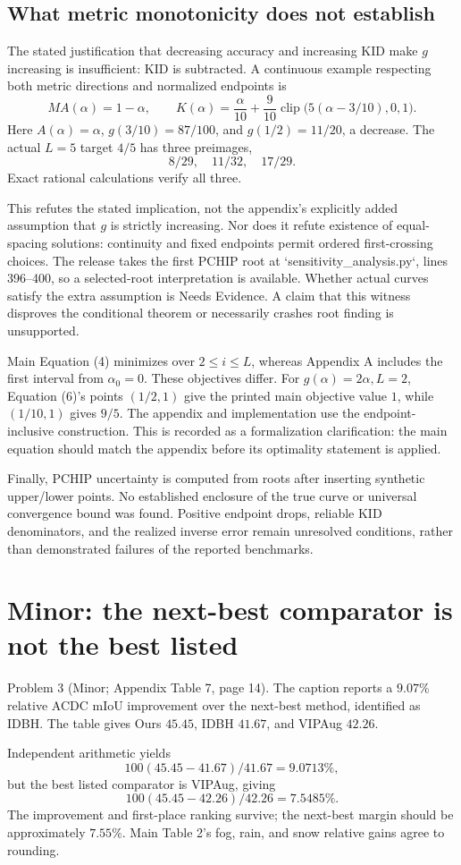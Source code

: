 \documentclass[10pt]{article}
\begin{document}
\subsection*{What metric monotonicity does not establish}
The stated justification that decreasing accuracy and increasing KID make \(g\) increasing is insufficient: KID is subtracted. A continuous example respecting both metric directions and normalized endpoints is \[MA(\alpha)=1-\alpha,\qquad
 K(\alpha)=\frac{\alpha}{10}
 +\frac9{10}\operatorname{clip}\bigl(5(\alpha-3/10),0,1\bigr).\] Here \(A(\alpha)=\alpha\), \(g(3/10)=87/100\), and \(g(1/2)=11/20\), a decrease. The actual \(L=5\) target \(4/5\) has three preimages, \[8/29,\quad 11/32,\quad 17/29.\] Exact rational calculations verify all three.\par
This refutes the stated implication, not the appendix’s explicitly added assumption that \(g\) is strictly increasing. Nor does it refute existence of equal-spacing solutions: continuity and fixed endpoints permit ordered first-crossing choices. The release takes the first PCHIP root at `sensitivity\_analysis.py`, lines 396–400, so a selected-root interpretation is available. Whether actual curves satisfy the extra assumption is Needs Evidence. A claim that this witness disproves the conditional theorem or necessarily crashes root finding is unsupported.\par
Main Equation (4) minimizes over \(2\le i\le L\), whereas Appendix A includes the first interval from \(\alpha_0=0\). These objectives differ. For \(g(\alpha)=2\alpha,L=2\), Equation (6)’s points \((1/2,1)\) give the printed main objective value \(1\), while \((1/10,1)\) gives \(9/5\). The appendix and implementation use the endpoint-inclusive construction. This is recorded as a formalization clarification: the main equation should match the appendix before its optimality statement is applied.\par
Finally, PCHIP uncertainty is computed from roots after inserting synthetic upper/lower points. No established enclosure of the true curve or universal convergence bound was found. Positive endpoint drops, reliable KID denominators, and the realized inverse error remain unresolved conditions, rather than demonstrated failures of the reported benchmarks.\par
\section*{Minor: the next-best comparator is not the best listed}
Problem 3 (Minor; Appendix Table 7, page 14).  The caption reports a \(9.07\%\) relative ACDC mIoU improvement over the next-best method, identified as IDBH. The table gives Ours \(45.45\), IDBH \(41.67\), and VIPAug \(42.26\).\par
Independent arithmetic yields \[100(45.45-41.67)/41.67=9.0713\%,\] but the best listed comparator is VIPAug, giving \[100(45.45-42.26)/42.26=7.5485\%.\] The improvement and first-place ranking survive; the next-best margin should be approximately \(7.55\%\). Main Table 2’s fog, rain, and snow relative gains agree to rounding.\par
\end{document}
